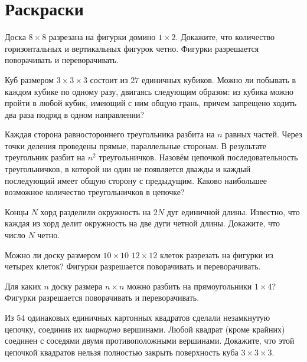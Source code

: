 

\section*{Раскраски}


\begin{problems}


\item
Доска $8 \times 8$ разрезана на фигурки домино $1 \times 2$.
Докажите, что количество горизонтальных и вертикальных фигурок четно.
Фигурки разрешается поворачивать и переворачивать.

\item
Куб размером $3 \times 3 \times 3$ состоит из $27$ единичных кубиков.
Можно ли побывать в каждом кубике по одному разу, двигаясь следующим образом:
из кубика можно пройти в любой кубик, имеющий с ним общую грань, причем
запрещено ходить два раза подряд в одном направлении?

\item
Каждая сторона равностороннего треугольника разбита на $n$ равных частей.
Через точки деления проведены прямые, параллельные сторонам.
В результате треугольник разбит на $n^2$ треугольничков.
Назовём цепочкой последовательность треугольничков, в которой ни один не
появляется дважды и каждый последующий имеет общую сторону с предыдущим.
Каково наибольшее возможное количество треугольничков в цепочке?

\item
Концы $N$ хорд разделили окружность на $2N$ дуг единичной длины.
Известно, что каждая из хорд делит окружность на две дуги четной длины.
Докажите, что число $N$ четно.

\item
Можно ли доску размером
\quad
\sbp $10 \times 10$
\quad
\sbp $12 \times 12$
\quad
клеток разрезать на фигурки
из четырех клеток?
Фигурки разрешается поворачивать и переворачивать.

\item
Для каких $n$ доску размера $n \times n$ можно разбить на прямоугольники
$1 \times 4$?
Фигурки разрешается поворачивать и переворачивать.

\item
Из $54$ одинаковых единичных картонных квадратов сделали незамкнутую цепочку,
соединив их \emph{шарнирно} вершинами.
Любой квадрат (кроме крайних) соединен с соседями двумя противоположными
вершинами.
Докажите, что этой цепочкой квадратов нельзя полностью закрыть поверхность куба
$3 \times 3 \times 3$.


\end{problems}
